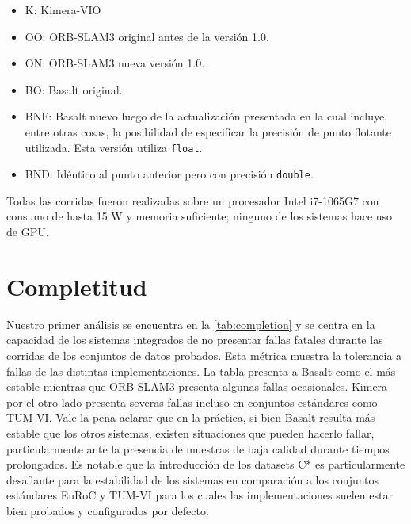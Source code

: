 \documentclass[ twoside,openright,titlepage,numbers=noenddot,%
                headinclude,footinclude,cleardoublepage=empty,abstract=on,
                BCOR=-5mm,paper=a4,fontsize=11pt
                ]{scrreprt}
\newcommand{\passthrough}[1]{#1}
\providecommand{\tightlist}{%
  \setlength{\itemsep}{0pt}\setlength{\parskip}{0pt}}
\begin{document}
\begin{itemize}
\tightlist
\item
  K: Kimera-VIO
\item
  OO: ORB-SLAM3 original antes de la versión 1.0.
\item
  ON: ORB-SLAM3 nueva versión 1.0.
\item
  BO: Basalt original.
\item
  BNF: Basalt nuevo luego de la actualización presentada en
  \textcite{demmelBasaltSquareRoot2021} la cual incluye, entre otras
  cosas, la posibilidad de especificar la precisión de punto flotante
  utilizada. Esta versión utiliza \passthrough{\lstinline!float!}.
\item
  BND: Idéntico al punto anterior pero con precisión
  \passthrough{\lstinline!double!}. \newline
\end{itemize}

Todas las corridas fueron realizadas sobre un procesador Intel i7-1065G7
con consumo de hasta 15 W y memoria suficiente; ninguno de los sistemas
hace uso de GPU.

\hypertarget{completitud}{%
\section{Completitud}\label{completitud}}

Nuestro primer análisis se encuentra en la \autoref{tab:completion} y se
centra en la capacidad de los sistemas integrados de no presentar fallas
fatales durante las corridas de los conjuntos de datos probados. Esta
métrica muestra la tolerancia a fallas de las distintas
implementaciones. La tabla presenta a Basalt como el más estable
mientras que ORB-SLAM3 presenta algunas fallas ocasionales. Kimera por
el otro lado presenta severas fallas incluso en conjuntos estándares
como TUM-VI. Vale la pena aclarar que en la práctica, si bien Basalt
resulta más estable que los otros sistemas, existen situaciones que
pueden hacerlo fallar, particularmente ante la presencia de muestras de
baja calidad durante tiempos prolongados. Es notable que la introducción
de los datasets C* es particularmente desafiante para la estabilidad de
los sistemas en comparación a los conjuntos estándares EuRoC y TUM-VI
para los cuales las implementaciones suelen estar bien probados y
configurados por defecto.
\end{document}
